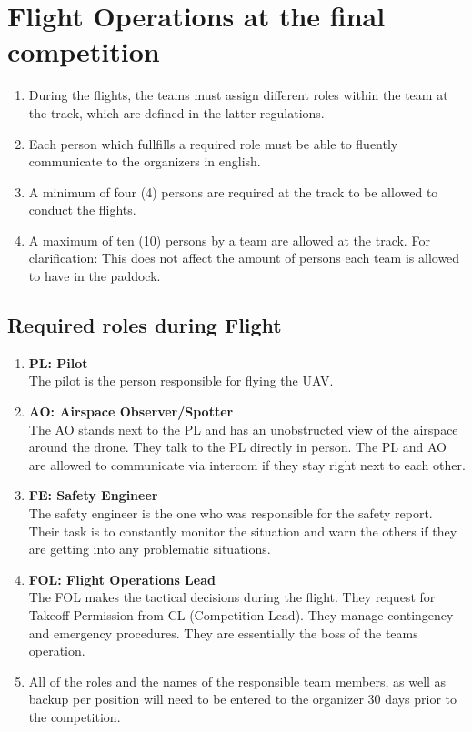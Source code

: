     \section{Flight Operations at the final competition}
    \begin{enumerate}
      \item During the flights, the teams must assign different roles within the team at the track, which are defined in the latter regulations.
      \item Each person which fullfills a required role must be able to fluently communicate to the organizers in english.
      \item A minimum of four (4) persons are required at the track to be allowed to conduct the flights.
      \item A maximum of ten (10) persons by a team are allowed at the track. For clarification: This does not affect the amount of persons each team is allowed to have in the paddock.  
    \end{enumerate}

    \subsection{Required roles during Flight}
    \begin{enumerate}
      \item \textbf{PL: Pilot}\\The pilot is the person responsible for flying the UAV.
      \item \textbf{AO: Airspace Observer/Spotter}\\The AO stands next to the PL and has an unobstructed view of the airspace around the drone. They talk to the PL directly in person. The PL and AO are allowed to communicate via intercom if they stay right next to each other. 
      \item \textbf{FE: Safety Engineer}\\The safety engineer is the one who was responsible for the safety report. Their task is to constantly monitor the situation and warn the others if they are getting into any problematic situations. 
      \item \textbf{FOL: Flight Operations Lead}\\The FOL makes the tactical decisions during the flight. They request for Takeoff Permission from CL (Competition Lead). They manage contingency and emergency procedures. They are essentially the boss of the teams operation.
      \item All of the roles and the names of the responsible team members, as well as backup per position will need to be entered to the organizer 30 days prior to the competition. 
    \end{enumerate}

